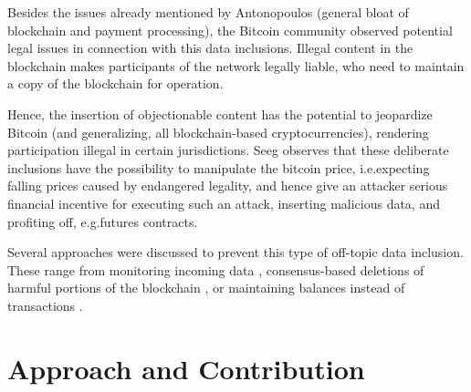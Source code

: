 \documentclass[a4paper,11pt,titlepage]{scrbook}
\begin{document}
Besides the issues already mentioned by Antonopoulos (general bloat of blockchain and payment processing), the Bitcoin community observed potential legal issues in connection with this data inclusions. \cite[See][]{bitcoinwiki_weaknesses_2011}
Illegal content in the blockchain makes participants of the network legally liable, who need to maintain a copy of the blockchain for operation.

Hence, the insertion of objectionable content has the potential to jeopardize Bitcoin (and generalizing, all blockchain-based cryptocurrencies), rendering participation illegal in certain jurisdictions.
Seeg observes that these deliberate inclusions have the possibility to manipulate the bitcoin price, i.e.\@ expecting falling prices caused by endangered legality, and hence give an attacker serious financial incentive for executing such an attack, inserting malicious data, and profiting off, e.g.\@ futures contracts. \cite[1--2]{seeg_hardening_2018}

Several approaches were discussed to prevent this type of off-topic data inclusion.
These range from monitoring incoming data \cite[chap.~IV.A]{matzutt_thwarting_2018}, consensus-based deletions of harmful portions of the blockchain \cites{ateniese_redactable_2017}{puddu_chain:_2017}, 
or maintaining balances instead of transactions \cite{bruce_miniblockchain_2017}.





\section{Approach and Contribution}
\end{document}
